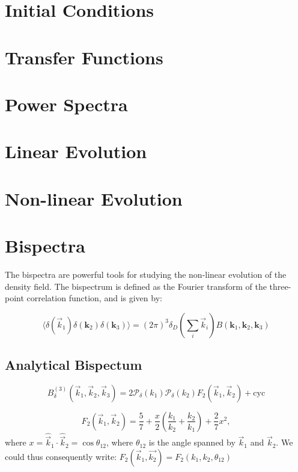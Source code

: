 %
%

\section{Initial Conditions}

\section{Transfer Functions}

\section{Power Spectra}
    

\section{Linear Evolution}

\section{Non-linear Evolution} 

\section{Bispectra}

    The bispectra are powerful tools for studying the non-linear evolution of the density field. The bispectrum is defined as the Fourier transform of the three-point correlation function, and is given by:

    \begin{equation}
        \langle \delta(\vec{k}_1) \delta(\mathbf{k}_2) \delta(\mathbf{k}_3) \rangle = (2\pi)^3 \delta_D\left(\sum_i\vec{k}_i\right) B(\mathbf{k}_1, \mathbf{k}_2, \mathbf{k}_3)
    \end{equation}


    \subsection{Analytical Bispectum}
        \begin{equation}
            B^{(3)}_\delta(\vec{k}_1,\vec{k}_2,\vec{k}_3) = 2\mathcal{P}_\delta(k_1)\mathcal{P}_\delta(k_2)F_2(\vec{k}_1, \vec{k}_2) + \mathrm{cyc}
        \end{equation}

        \begin{equation}
            F_2(\vec{k}_1,\vec{k}_2) = \frac{5}{7} + \frac{x}{2}\left(\frac{k_1}{k_2}+\frac{k_2}{k_1}\right) + \frac{2}{7}x^2,
        \end{equation}
        where $x = \hat{\vec{k}}_1 \cdot \hat{\vec{k}}_2 = \cos{\theta_{12}}$, where $\theta_{12}$ is the angle spanned by $\vec{k}_1$ and $\vec{k}_2$. We could thus consequently write: $F_2(\vec{k}_1,\vec{k_2}) = F_2(k_1,k_2,\theta_{12})$ 


